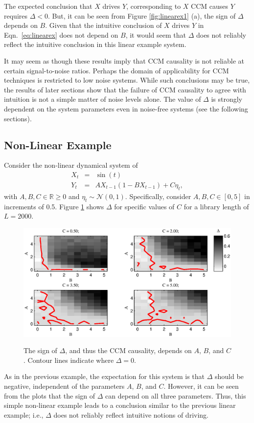 \documentclass[twocolumn,aps,pre,groupedaddress]{revtex4-1}
\begin{document}
The expected conclusion that $X$ drives $Y$, corresponding to $X$ CCM causes $Y$ requires $\Delta<0$.  But, it can be seen from Figure \ref{fig:linearex1} (a), the sign of $\Delta$ depends on $B$.  Given that the intuitive conclusion of $X$ drives $Y$ in Eqn.\ \ref{eq:linearex} does not depend on $B$, it would seem that $\Delta$ does not reliably reflect the intuitive conclusion in this linear example system. 

It may seem as though these results imply that CCM causality is not reliable at certain signal-to-noise ratios.  Perhaps the domain of applicability for CCM techniques is restricted to low noise systems.  While such conclusions may be true, the results of later sections show that the failure of CCM causality to agree with intuition is not a simple matter of noise levels alone.  The value of $\Delta$ is strongly dependent on the system parameters even in noise-free systems (see the following sections). 

\subsection{Non-Linear Example}
Consider the non-linear dynamical system of
\begin{eqnarray}
\label{eqn:nonlinearEX}
X_t &=& \sin(t)\\
Y_t &=& AX_{t-1}\left(1-BX_{t-1}\right)+C\eta_t,
\end{eqnarray}
with $A,B,C\in\mathbb{R}\ge 0$ and $\eta_t\sim\mathcal{N}\left(0,1\right)$.  Specifically, consider $A,B,C\in[0,5]$ in increments of 0.5.  Figure \ref{fig:nonlinearex} shows $\Delta$ for specific values of $C$ for a library length of $L=2000$.
\begin{figure}[ht]
\includegraphics[scale=0.5]{NonLinearEx.eps} \\
\caption{The sign of $\Delta$, and thus the CCM causality, depends on $A$, $B$, and $C$. Contour lines indicate where $\Delta=0$.}
\label{fig:nonlinearex}
\end{figure}
As in the previous example, the expectation for this system is that $\Delta$ should be negative, independent of the parameters $A$, $B$, and $C$.  However, it can be seen from the plots that the sign of $\Delta$ can depend on all three parameters.  Thus, this simple non-linear example leads to a conclusion similar to the previous linear example; i.e., $\Delta$ does not reliably reflect intuitive notions of driving.
\end{document}
